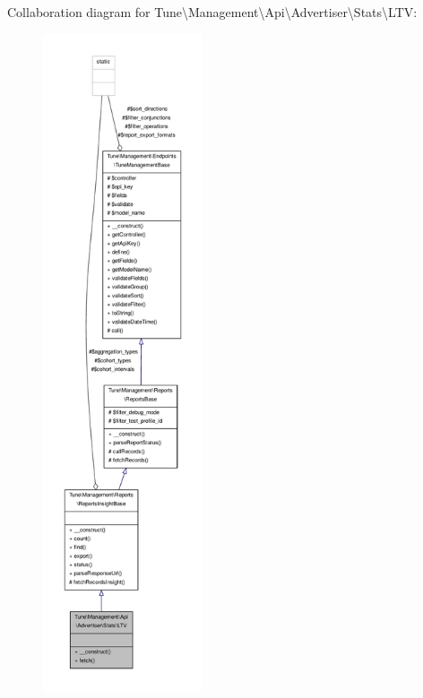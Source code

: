 Collaboration diagram for Tune\textbackslash{}Management\textbackslash{}Api\textbackslash{}Advertiser\textbackslash{}Stats\textbackslash{}L\-T\-V\-:
\nopagebreak
\begin{figure}[H]
\begin{center}
\leavevmode
\includegraphics[height=550pt]{classTune_1_1Management_1_1Api_1_1Advertiser_1_1Stats_1_1LTV__coll__graph}
\end{center}
\end{figure}

